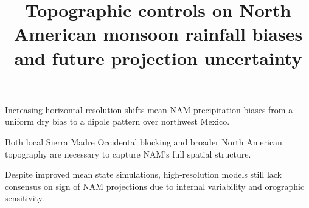 \documentclass[draft]{agujournal2019}
\begin{document}
\title{Topographic controls on North American monsoon rainfall biases and future projection uncertainty}







\begin{keypoints}
\item Increasing horizontal resolution shifts mean NAM precipitation biases from a uniform dry bias to a dipole pattern over northwest Mexico.
\item Both local Sierra Madre Occidental blocking and broader North American topography are necessary to capture NAM's full spatial structure.
\item Despite improved mean state simulations, high-resolution models still lack consensus on sign of NAM projections due to internal variability and orographic sensitivity. 
\end{keypoints}

\end{document}
